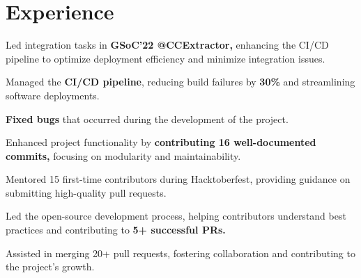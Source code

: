 \documentclass[]{deedy-resume-openfont}
\begin{document}

\section{Experience}
\hfill {}
\vspace{1.7mm}
\begin{tightemize}
	\item Led integration tasks in \textbf{GSoC'22 @CCExtractor,} enhancing the CI/CD pipeline to optimize deployment efficiency and minimize integration issues.
	\vspace{-1mm}
	\item Managed the \textbf{CI/CD pipeline}, reducing build failures by \textbf{30\%} and streamlining software deployments.
	\vspace{-1mm}
	\item \textbf{Fixed bugs} that occurred during the development of the project.
	\vspace{-1mm}
	\item Enhanced project functionality by \textbf{contributing 16 well-documented commits,} focusing on modularity and maintainability.
\end{tightemize}
\sectionsep

\hfill {}
\vspace{1.7mm}
\begin{tightemize}
	\item Mentored 15 first-time contributors during Hacktoberfest, providing guidance on submitting high-quality pull requests.
	\vspace{-1mm}
	\item Led the open-source development process, helping contributors understand best practices and contributing to \textbf{5+ successful PRs.}
	\vspace{-1mm}
	\item Assisted in merging 20+ pull requests, fostering collaboration and contributing to the project's growth.
\end{tightemize}
\sectionsep
\end{document}
